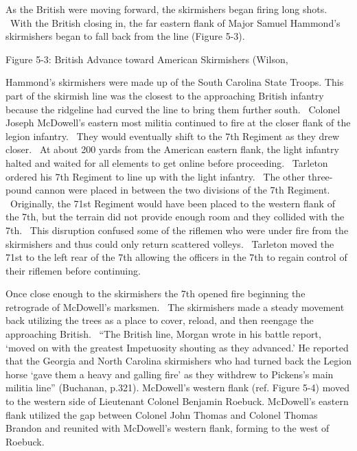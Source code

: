 As the British were moving forward, the skirmishers began firing long shots.
 With the British closing in, the far eastern flank of Major Samuel Hammond’s
skirmishers began to fall back from the line (Figure 5-3).  

Figure 5-3: British Advance toward American Skirmishers (Wilson,

Hammond's skirmishers were made up of the South Carolina State Troops.  This
part of the skirmish line was the closest to the approaching British infantry
because the ridgeline had curved the line to bring them further south.  Colonel
Joseph McDowell’s eastern most militia continued to fire at the closer flank of
the legion infantry.  They would eventually shift to the 7th Regiment as they
drew closer.  At about 200 yards from the American eastern flank, the light
infantry halted and waited for all elements to get online before proceeding.
 Tarleton ordered his 7th Regiment to line up with the light infantry.  The
other three-pound cannon were placed in between the two divisions of the 7th
Regiment.  Originally, the 71st Regiment would have been placed to the western
flank of the 7th, but the terrain did not provide enough room and they collided
with the 7th.  This disruption confused some of the riflemen who were under fire
from the skirmishers and thus could only return scattered volleys.  Tarleton
moved the 71st to the left rear of the 7th allowing the officers in the 7th to
regain control of their riflemen before continuing.

Once close enough to the skirmishers the 7th opened fire beginning the
retrograde of McDowell’s marksmen.  The skirmishers made a steady movement back
utilizing the trees as a place to cover, reload, and then reengage the
approaching British.  “The British line, Morgan wrote in his battle report,
‘moved on with the greatest Impetuosity shouting as they advanced.’ He reported
that the Georgia and North Carolina skirmishers who had turned back the Legion
horse ‘gave them a heavy and galling fire’ as they withdrew to Pickens’s main
militia line” (Buchanan, p.321).  McDowell’s western flank (ref. Figure 5-4)
moved to the western side of Lieutenant Colonel Benjamin Roebuck.  McDowell’s
eastern flank utilized the gap between Colonel John Thomas and Colonel Thomas
Brandon and reunited with McDowell’s western flank, forming to the west of
Roebuck. 



